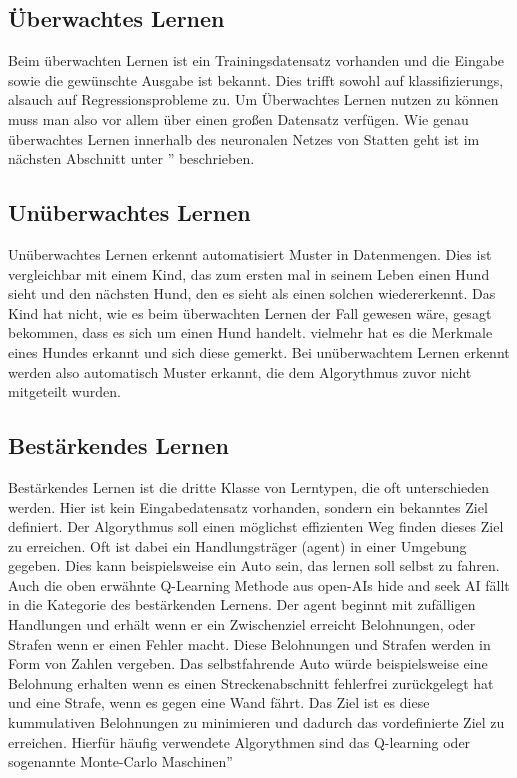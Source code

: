 \documentclass{article}
\begin{document}
\subsection{Überwachtes Lernen}
Beim überwachten Lernen ist ein Trainingsdatensatz vorhanden und die Eingabe sowie die gewünschte Ausgabe ist bekannt. Dies trifft sowohl auf klassifizierungs, alsauch auf Regressionsprobleme zu. Um Überwachtes Lernen nutzen zu können muss man also vor allem über einen großen Datensatz verfügen. Wie genau überwachtes Lernen innerhalb des neuronalen Netzes von Statten geht ist im nächsten Abschnitt unter \glqq{}'' beschrieben.
\subsection{Unüberwachtes Lernen}
Unüberwachtes Lernen erkennt automatisiert Muster in Datenmengen. Dies ist vergleichbar mit einem Kind, das zum ersten mal in seinem Leben einen Hund sieht und den nächsten Hund, den es sieht als einen solchen wiedererkennt. Das Kind hat nicht, wie es beim überwachten Lernen der Fall gewesen wäre, gesagt bekommen, dass es sich um einen Hund handelt. vielmehr hat es die Merkmale eines Hundes erkannt und sich diese gemerkt.
Bei unüberwachtem Lernen erkennt werden also automatisch Muster erkannt, die dem Algorythmus zuvor nicht mitgeteilt wurden. 
\subsection{Bestärkendes Lernen}
Bestärkendes Lernen ist die dritte Klasse von Lerntypen, die oft unterschieden werden. Hier ist kein Eingabedatensatz vorhanden, sondern ein bekanntes Ziel definiert. Der Algorythmus soll einen möglichst effizienten Weg finden dieses Ziel zu erreichen. Oft ist dabei ein Handlungsträger (agent) in einer Umgebung gegeben. Dies kann beispielsweise ein Auto sein, das lernen soll selbst zu fahren. Auch die oben erwähnte Q-Learning Methode aus open-AIs hide and seek AI fällt in die Kategorie des bestärkenden Lernens. Der agent beginnt mit zufälligen Handlungen und erhält wenn er ein Zwischenziel erreicht Belohnungen, oder Strafen wenn er einen Fehler macht. Diese Belohnungen und Strafen werden in Form von Zahlen vergeben. Das selbstfahrende Auto würde beispielsweise eine Belohnung erhalten wenn es einen Streckenabschnitt fehlerfrei zurückgelegt hat und eine Strafe, wenn es gegen eine Wand fährt. Das Ziel ist es diese kummulativen Belohnungen zu minimieren und dadurch das vordefinierte Ziel zu erreichen. Hierfür häufig verwendete Algorythmen sind das Q-learning oder sogenannte \glqq Monte-Carlo Maschinen''
\end{document}

